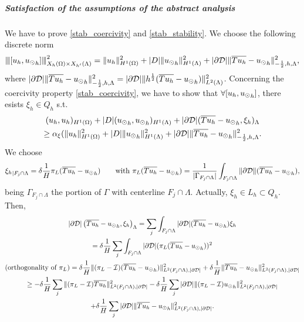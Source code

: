 \subparagraph{Satisfaction of the assumptions of the 
abstract analysis} 
We have to prove \eqref{stab_coercivity} and \eqref{stab_stability}.
We choose the following discrete norm
\begin{equation*}
{\left\vert\kern-0.25ex\left\vert\kern-0.25ex\left\vert [u_h, {u_{\odot}}_h] \right\vert\kern-0.25ex\right\vert\kern-0.25ex\right\vert}^2_{X_h(\Omega)\times X_{h'}(\Lambda) }
= \|u_h\|^2_{H^1(\Omega)}+|D|\|{u_{\odot}}_h\|^2_{H^1(\Lambda)} + |\partial\mathcal{D}|\|\overline{Tu_h} - {u_{\odot}}_h\|^2_{-\frac 12, h, \Lambda},
\end{equation*}
where $|\partial\mathcal{D}|\|\overline{Tu_h} - {u_{\odot}}_h\|^2_{-\frac 12, h, \Lambda} = |\partial\mathcal{D}|\|h^{\frac 12} (\overline{Tu_h} - {u_{\odot}}_h)\|^2_{L^2(\Lambda)} $.
Concerning the coercivity property \eqref{stab_coercivity}, we have to show that $\forall [u_h, {u_{\odot}}_h]$, there esists $\xi_h \in Q_h$ s.t.
\begin{multline*}
(u_h,u_h)_{H^1(\Omega)}+ |D|({u_{\odot}}_h, {u_{\odot}}_h)_{H^1(\Lambda)} +  |\partial\mathcal{D}| (\overline{Tu_h} - {u_{\odot}}_h, \xi_h)_{\Lambda} \\
\geq \alpha_{\xi}(\|u_h\|^2_{H^1(\Omega)}+|D|\|{u_{\odot}}_h\|^2_{H^1(\Lambda)}+ |\partial\mathcal{D}|\|\overline{Tu_h} - {u_{\odot}}_h\|^2_{-\frac 12, h, \Lambda}.
\end{multline*}
We choose 
\begin{equation*}
{\xi_h}_{|F_j\cap \Lambda}=\delta \frac 1H \pi_L(\overline{Tu_h}-{u_{\odot}}_h) \qquad \text{with } \pi_L(\overline{Tu_h}-{u_{\odot}}_h) =\frac{1}{|\Gamma_{F_j\cap \Lambda}|}\int_{F_j\cap \Lambda}\|\partial\mathcal{D}\| (\overline{Tu_h}- {u_{\odot}}_h),
\end{equation*}
being $\Gamma_{F_j\cap \Lambda}$ the portion of $\Gamma$ with centerline $F_j\cap \Lambda$. 
Actually, $\xi_h\in L_h \subset Q_h$. Then,
\begin{multline*}
|\partial\mathcal{D}|\left( \overline{Tu_h} - {u_{\odot}}_h, \xi _h \right)_{\Lambda} 
= \sum_j \int_{F_j\cap \Lambda} |\partial\mathcal{D}|( \overline{Tu_h} - {u_{\odot}}_h)\xi_h
\\
= \delta \frac{1}{H} \sum_j \int_{F_j\cap \Lambda}|\partial\mathcal{D}| (\pi_L( \overline{Tu_h} - {u_{\odot}}_h) )^2
\\
(\text{orthogonality of $\pi_L$}) =  \delta \frac{1}{H} \|(\pi_L-\mathcal{I})(\overline{Tu_h} - {u_{\odot}}_h)\|^2_{L^2(F_j\cap \Lambda),|\partial\mathcal{D}|} + \delta \frac{1}{H} \|\overline{Tu_h} - {u_{\odot}}_h\|^2_{L^2(F_j\cap \Lambda),|\partial\mathcal{D}|}
\\ 
\geq -\delta \frac 1H \sum_j \|(\pi_L - \mathcal{I})\overline{Tu_h}\|^2_{L^2(F_j\cap \Lambda), |\partial\mathcal{D}|}
- \delta \frac 1H \sum_j |\partial\mathcal{D}|\|(\pi_L - \mathcal{I}){u_{\odot}}_h\|^2_{L^2(F_j\cap \Lambda),|\partial\mathcal{D}|}
\\ 
+ \delta \frac 1H \sum_j |\partial\mathcal{D}|\|\overline{Tu_h}-{u_{\odot}}_h\|^2_{L^2(F_j\cap \Lambda),|\partial\mathcal{D}|}. 
\end{multline*}
